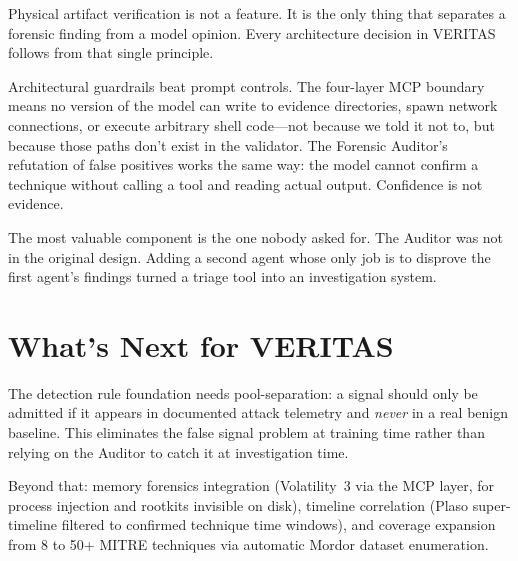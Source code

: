 \documentclass[10pt, letterpaper]{article}
\begin{document}
Physical artifact verification is not a feature. It is the only thing
that separates a forensic finding from a model opinion. Every
architecture decision in VERITAS follows from that single principle.

Architectural guardrails beat prompt controls. The four-layer MCP
boundary means no version of the model can write to evidence directories,
spawn network connections, or execute arbitrary shell code---not because
we told it not to, but because those paths don't exist in the validator.
The Forensic Auditor's refutation of false positives works the same way:
the model cannot confirm a technique without calling a tool and reading
actual output. Confidence is not evidence.

The most valuable component is the one nobody asked for. The Auditor was
not in the original design. Adding a second agent whose only job is to
disprove the first agent's findings turned a triage tool into an
investigation system.

\section{What's Next for VERITAS}

The detection rule foundation needs pool-separation: a signal should only
be admitted if it appears in documented attack telemetry and \emph{never}
in a real benign baseline. This eliminates the false signal problem at
training time rather than relying on the Auditor to catch it at
investigation time.

Beyond that: memory forensics integration (Volatility~3 via the MCP
layer, for process injection and rootkits invisible on disk), timeline
correlation (Plaso super-timeline filtered to confirmed technique time
windows), and coverage expansion from 8 to 50+ MITRE techniques via
automatic Mordor dataset enumeration.
\end{document}
